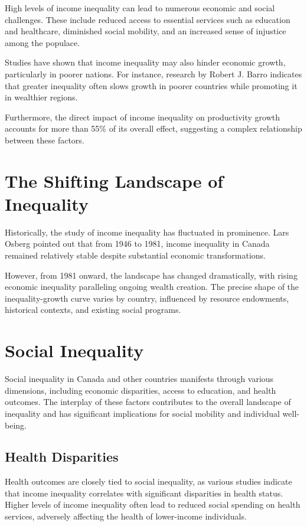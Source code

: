 \documentclass[12pt]{article}
\begin{document}
High levels of income inequality can lead to numerous economic and social challenges. These include reduced access to essential services such as education and healthcare, diminished social mobility, and an increased sense of injustice among the populace.

Studies have shown that income inequality may also hinder economic growth, particularly in poorer nations. For instance, research by Robert J. Barro indicates that greater inequality often slows growth in poorer countries while promoting it in wealthier regions.

Furthermore, the direct impact of income inequality on productivity growth accounts for more than 55\% of its overall effect, suggesting a complex relationship between these factors.

\section*{The Shifting Landscape of Inequality}

Historically, the study of income inequality has fluctuated in prominence. Lars Osberg pointed out that from 1946 to 1981, income inequality in Canada remained relatively stable despite substantial economic transformations.

However, from 1981 onward, the landscape has changed dramatically, with rising economic inequality paralleling ongoing wealth creation. The precise shape of the inequality-growth curve varies by country, influenced by resource endowments, historical contexts, and existing social programs.

\section*{Social Inequality}

Social inequality in Canada and other countries manifests through various dimensions, including economic disparities, access to education, and health outcomes. The interplay of these factors contributes to the overall landscape of inequality and has significant implications for social mobility and individual well-being.

\subsection*{Health Disparities}

Health outcomes are closely tied to social inequality, as various studies indicate that income inequality correlates with significant disparities in health status. Higher levels of income inequality often lead to reduced social spending on health services, adversely affecting the health of lower-income individuals.
\end{document}
